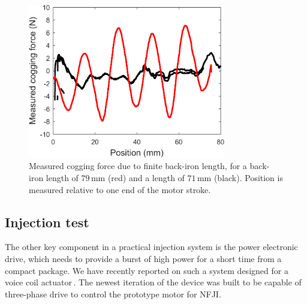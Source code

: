             
            \begin{figure}[h]
                \centering
                \includegraphics[width=3.4in]{chap5/images/cogging_measurement.png}
                \caption{Measured cogging force due to finite back-iron length, for a back-iron length of $79\,\mathrm{mm}$ (red) and a length of $71\,\mathrm{mm}$ (black). Position is measured relative to one end of the motor stroke.}
                \label{fig:chap/experiment/validation/cogging_force/cogging_measurement}
            \end{figure}
        
        
        \subsection{Injection test}                 \label{Chapter:experiment/validation/injection test}
        
        
            The other key component in a practical injection system is the power electronic drive, which needs to provide a burst of high power for a short time from a compact package. We have recently reported on such a system designed for a voice coil actuator\,\cite{Ruddy2017}. The newest iteration of the device was built to be capable of three-phase drive to control the prototype motor for NFJI.



